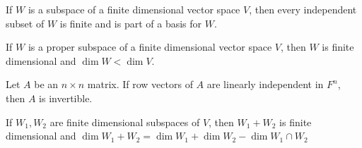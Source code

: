 	\begin{theorem}
		If $W$ is a subspace of a finite dimensional vector space $V$, then every independent subset of $W$ is finite and is part of a basis for $W$.
	\end{theorem}
	\begin{corollary}
		If $W$ is a proper subspace of a finite dimensional vector space $V$, then $W$ is finite dimensional and $\dim W < \dim V$.
	\end{corollary}
	\begin{corollary}
		Let $A$ be an $n \times n$ matrix. If row vectors of $A$ are linearly independent in $F^n$, then $A$ is invertible.
	\end{corollary}
	\begin{corollary}
		If $W_1, W_2$ are finite dimensional subspaces of $V$, then $W_1 + W_2$ is finite dimensional and
		$\dim W_1+W_2 = \dim W_1 + \dim W_2 - \dim W_1 \cap W_2$
	\end{corollary}
